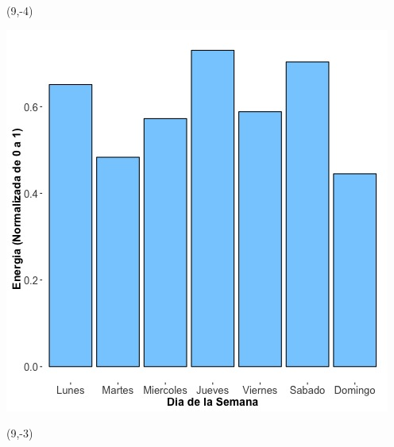 \documentclass{article}\usepackage[]{graphicx}\usepackage[]{color}
\newenvironment{knitrout}{}{} %
\begin{document}
 \begin{textblock}{1}(9,-4)
\begin{minipage}{20em}
\begingroup

\endgroup
\end{minipage}
\end{textblock}


\begin{knitrout}
\color{fgcolor}
\includegraphics[scale=0.65]{figure/A29_day_of_week_plot} 
\end{knitrout}


 \begin{textblock}{1}(9,-3)
\begin{minipage}{20em}
\begingroup

\endgroup
\end{minipage}
\end{textblock}
\end{document}
